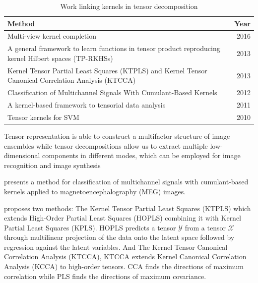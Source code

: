 \documentclass[letterpaper,12pt]{article}
\begin{document}
\begin{table}[!ht]
\renewcommand{\arraystretch}{1.3}
\caption{Work linking kernels in tensor decomposition}
\label{tb:tensor_kernel}
\centering
\begin{tabular}{|p{7cm}|r|}
\hline
Method & Year\\
\hline
\hline
Multi-view kernel completion & 2016 \cite{Bhadra2016}\\
\hline
A general framework to learn functions in tensor product reproducing kernel Hilbert spaces (TP-RKHSs) & 2013 \cite{Signoretto2013}\\
\hline
Kernel Tensor Partial Least Squares (KTPLS) and Kernel Tensor Canonical Correlation Analysis (KTCCA) & 2013 \cite{Zhao2013}\\
\hline
Classification of Multichannel Signals With Cumulant-Based Kernels & 2012 \cite{Signoretto2012}\\
\hline
A kernel-based framework to tensorial data analysis & 2011 \cite{Signoretto2011}\\
\hline
Tensor kernels for SVM & 2010 \cite{Hardoon2010}\\
\hline
\end{tabular}
\end{table}


Tensor representation is able to construct a multifactor structure of image ensembles while tensor decompositions allow us to extract multiple low-dimensional components in different modes, which can be employed for image recognition and image synthesis \cite{Zhao2013}%

\cite{Signoretto2012} presents a method for classification of multichannel signals with cumulant-based kernels applied to magnetoencephalography (MEG) images.

\cite{Zhao2013} proposes two methods: The Kernel Tensor Partial Least Squares (KTPLS) which extends High-Order Partial Least Squares (HOPLS) combining it with Kernel Partial Least Squares (KPLS). HOPLS predicts a tensor $\mathcal{Y}$ from a tensor $\mathcal{X}$ through multilinear projection of the data onto the latent space followed by regression against the latent variables. And The Kernel Tensor Canonical Correlation Analysis (KTCCA), KTCCA extends Kernel Canonical Correlation Analysis (KCCA) to high-order tensors. CCA finds the directions of maximum correlation while PLS finds the directions of maximum covariance.
\end{document}
